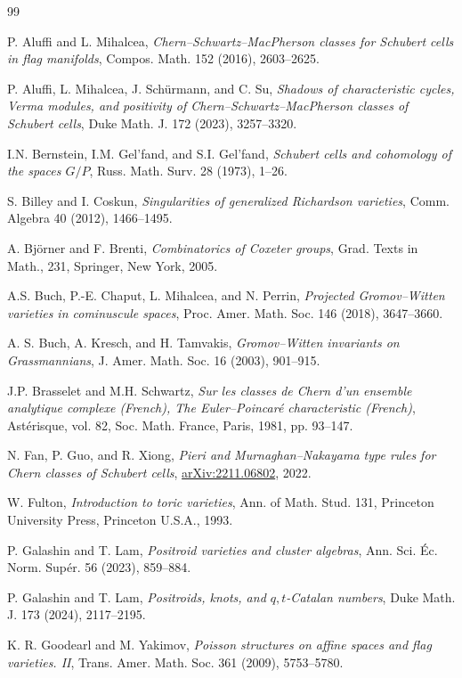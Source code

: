 \documentclass[12pt]{amsart}
\begin{document}
\begin{thebibliography}{99}

P. Aluffi and L. Mihalcea, {\em Chern–Schwartz–MacPherson classes for Schubert cells in flag manifolds}, Compos. Math. 152 (2016), 2603--2625. 

P. Aluffi, L. Mihalcea,  J. Sch\"urmann, and C. Su, {\em Shadows of characteristic cycles, Verma modules, and positivity of Chern--Schwartz--MacPherson classes of Schubert cells}, Duke Math. J. 172 (2023), 3257--3320.

I.N. Bernstein, I.M. Gel'fand, and S.I. Gel'fand, 
{\em Schubert cells and cohomology of the spaces $G/P$}, Russ. Math. Surv. 28 (1973), 1--26.

S. Billey and I. Coskun, {\em Singularities of generalized Richardson varieties}, Comm. Algebra  40 (2012), 1466--1495.

A. Bj\"orner and F. Brenti, {\em Combinatorics of Coxeter groups}, Grad. Texts in Math., 231, Springer, New York, 2005.

A.S. Buch, P.-E. Chaput, L. Mihalcea, and N. Perrin, {\em Projected Gromov--Witten varieties
in cominuscule spaces}, Proc. Amer. Math. Soc. 146 (2018), 3647–3660.

A. S. Buch, A. Kresch, and H. Tamvakis, {\em Gromov--Witten invariants on Grassmannians}, J. Amer. Math. Soc. 16 (2003),  901–915.  

J.P. Brasselet and M.H. Schwartz, {\em Sur les classes de Chern d’un ensemble analytique complexe (French), The Euler--Poincar\'e characteristic (French)}, Ast\'erisque, vol. 82, Soc. Math. France, Paris, 1981, pp. 93–147.

N. Fan, P. Guo, and R. Xiong,
{\em Pieri and Murnaghan--Nakayama type rules for Chern classes of Schubert cells}, \href{https://arxiv.org/abs/2211.06802}{arXiv:2211.06802}, 2022.


W. Fulton, {\it Introduction to toric varieties}, Ann. of Math. Stud. 131, Princeton University Press, Princeton U.S.A., 1993.


P. Galashin and T. Lam, {\em Positroid varieties and cluster algebras},   Ann. Sci. \'Ec. Norm. Sup\'er.  56 (2023),  859--884.

P. Galashin and T. Lam, {\em
Positroids, knots, and $q,t$-Catalan numbers}, Duke Math. J. 173 (2024), 2117--2195. 


K. R. Goodearl and M. Yakimov, {\em Poisson structures on aﬃne spaces and flag varieties. II}, Trans.
Amer. Math. Soc. 361 (2009),  5753--5780.


\end{thebibliography}
\end{document}

